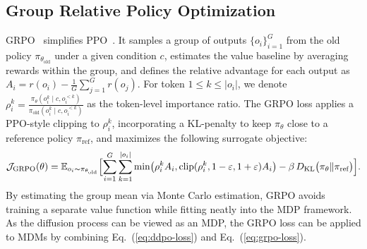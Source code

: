 \subsection{Group Relative Policy Optimization}
\label{sec:pre-grpo}
GRPO~\citep{shao2024deepseekmath} simplifies PPO~\citep{schulman2017proximal}. It samples a group of outputs \(\{o_i\}_{i=1}^G\) from the old policy \(\pi_{\theta_\text{old}}\) under a given condition $c$, estimates the value baseline by averaging rewards within the group, and defines the relative advantage for each output as $A_i=r(o_i)-\frac1G\sum_{j=1}^G r(o_j)$. For token $1\leq k\leq |o_i|$, we denote $\rho_i^k =\frac{\pi_\theta(o_i^k\mid c,o_i^{<k})}{\pi_{\text{old}}(o_i^k\mid c,o_i^{<k})}$ as the token-level importance ratio.
The GRPO loss applies a PPO-style clipping to $\rho_i^k$, incorporating a KL-penalty to keep $\pi_\theta$ close to a reference policy $\pi_{\text{ref}}$, and maximizes the following surrogate objective:
\begin{equation}
\label{eq:grpo-loss}
\mathcal J_{\text{GRPO}}(\theta)
= 
\mathbb E_{o_i\sim \pi_{\theta_{\text{old}}}} \Bigl[\sum_{i=1}^G\sum_{k=1}^{|o_i|}
  \min\bigl(\rho_i^k A_i,\mathrm{clip}(\rho_i^k,1-\varepsilon,1+\varepsilon)A_i\bigr)
  -\beta\,D_{\mathrm{KL}}\bigl(\pi_\theta\|\pi_{\text{ref}}\bigr)\Bigr].
\end{equation}
By estimating the group mean via Monte Carlo estimation, GRPO avoids training a separate value function while fitting neatly into the MDP framework. As the diffusion process can be viewed as an MDP, the GRPO loss can be applied to MDMs by combining Eq.~(\ref{eq:ddpo-loss}) and Eq.~(\ref{eq:grpo-loss}).